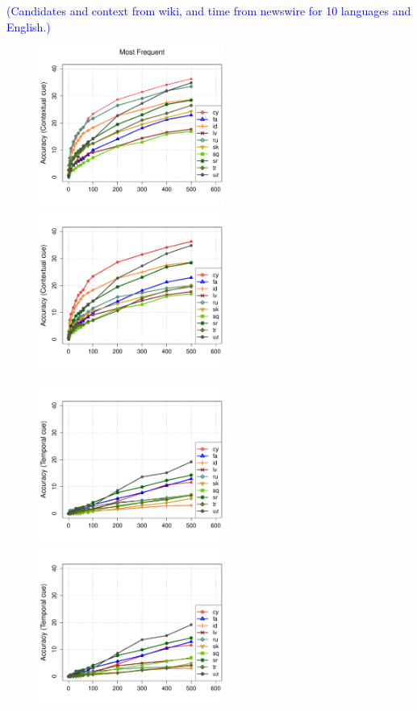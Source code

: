 \documentclass{article}
\newcommand{\todo}[1]{\textcolor{blue}{(#1)}}
\begin{document}
\todo{Candidates and context from wiki, and time from newswire for 10 languages and English.}

\begin{figure}[h!]
\centerline{\mbox{\includegraphics[width=2.4in]{figures/exp3/freq/freqcontext} \includegraphics[width=2.4in]{figures/exp3/rand/randcontext}}}
\centerline{\mbox{\includegraphics[width=2.4in]{figures/exp3/freq/freqtime} \includegraphics[width=2.4in]{figures/exp3/rand/randtime}}}

\end{figure}
\end{document}

